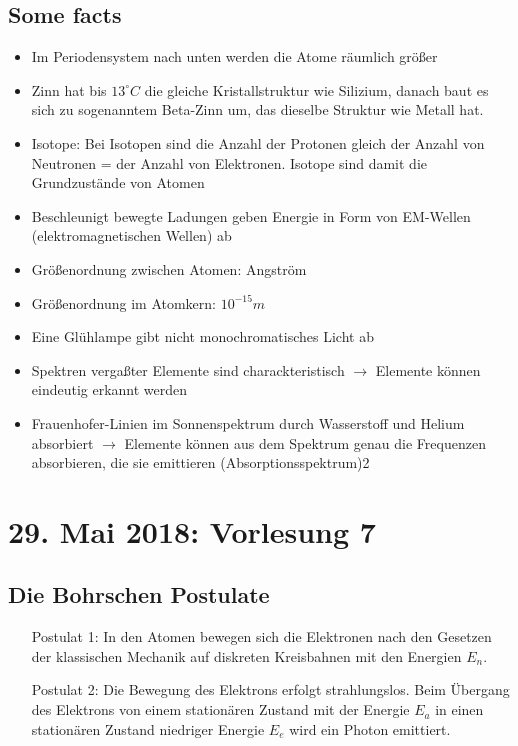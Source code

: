 \documentclass[12pt,a4paper]{report}%
\numberwithin{equation}{section}
\numberwithin{equation}{subsection}
\begin{document}
    \subsection{Some facts}
    \begin{itemize}
	    \item Im Periodensystem nach unten werden die Atome räumlich größer
	    \item Zinn hat bis $13^\circ C$ die gleiche Kristallstruktur wie Silizium, danach baut es sich zu sogenanntem Beta-Zinn um, das dieselbe Struktur wie Metall hat.
	    \item Isotope: Bei Isotopen sind die Anzahl der Protonen gleich der Anzahl von Neutronen = der Anzahl von Elektronen. Isotope sind damit die Grundzustände von Atomen
	    \item Beschleunigt bewegte Ladungen geben Energie in Form von EM-Wellen (elektromagnetischen Wellen) ab
	    \item Größenordnung zwischen Atomen: Angström
	    \item Größenordnung im Atomkern: $10^{-15}m$
	    \item Eine Glühlampe gibt nicht monochromatisches Licht ab
	    \item Spektren vergaßter Elemente sind charackteristisch $\rightarrow$ Elemente können eindeutig erkannt werden
	    \item Frauenhofer-Linien im Sonnenspektrum durch Wasserstoff und Helium absorbiert $\rightarrow$ Elemente können aus dem Spektrum genau die Frequenzen absorbieren, die sie emittieren (Absorptionsspektrum)2
    \end{itemize}
    \newpage

	\section{29. Mai 2018: Vorlesung 7}
		\subsection{Die Bohrschen Postulate}
		\begin{itemize}
		  \item[Postulat 1: ] In den Atomen bewegen sich die Elektronen nach den Gesetzen der klassischen Mechanik auf diskreten Kreisbahnen mit den Energien $E_n$.
		  \item[Postulat 2: ] Die Bewegung des Elektrons erfolgt strahlungslos. Beim Übergang des Elektrons von einem stationären Zustand mit der Energie $E_a$ in einen stationären Zustand niedriger Energie $E_e$ wird ein Photon emittiert.
		\end{itemize}
		
\end{document}
